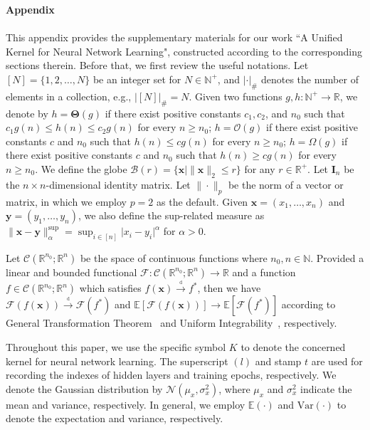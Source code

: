 \documentclass[review,10pt]{JMtemplate}
\begin{document}
{\Large\bfseries Appendix} \\~\\
This appendix provides the supplementary materials for our work ``A Unified Kernel for Neural Network Learning", constructed according to the corresponding sections therein. Before that, we first review the useful notations. Let $[N] = \{1, 2, \dots, N\}$ be an integer set for $N \in \mathbb{N}^+$, and $|\cdot|_{\#}$ denotes the number of elements in a collection, e.g., $|[N]|_{\#} = N$. Given two functions $g,h\colon \mathbb{N}^+\rightarrow \mathbb{R}$, we denote by $h=\mathbf{\Theta}(g)$ if there exist positive constants $c_1,c_2$, and $n_0$ such that $c_1g(n) \leq h(n) \leq c_2g(n)$ for every $n \geq n_0$; $h=\mathcal{O}(g)$ if there exist positive constants $c$ and $n_0$ such that $h(n) \leq cg(n)$ for every $n \geq n_0$; $h=\Omega(g)$ if there exist positive constants $c$ and $n_0$ such that $h(n) \geq cg(n)$ for every $n \geq n_0$. We define the globe $\mathcal{B}(r) = \{ \boldsymbol{x} \mid \| \boldsymbol{x} \|_2 \leq r \}$ for any $r\in\mathbb{R}^+$. Let $\mathbf{I}_n$ be the $n \times n$-dimensional identity matrix. Let $\|\cdot\|_p$ be the norm of a vector or matrix, in which we employ $p=2$ as the default. Given $\boldsymbol{x}=(x_1,\dots,x_n)$ and $\boldsymbol{y}=(y_1,\dots,y_n)$, we also define the sup-related measure as $\| \boldsymbol{x} - \boldsymbol{y} \|_{\alpha}^{\textrm{sup}} = \sup_{i\in[n]} \big| x_i - y_i \big|^{\alpha}$ for $\alpha>0$.

Let $\mathcal{C}(\mathbb{R}^{n_0};\mathbb{R}^n)$ be the space of continuous functions where $n_0,n\in\mathbb{N}$. Provided a linear and bounded functional $\mathcal{F}: \mathcal{C}(\mathbb{R}^{n_0};\mathbb{R}^n) \to \mathbb{R}$ and a function $f \in  \mathcal{C}(\mathbb{R}^{n_0};\mathbb{R}^n)$ which satisfies $f(\boldsymbol{x}) \overset{\underset{\mathrm{d}}{}}{\to} f^*$, then we have $\mathcal{F} (f(\boldsymbol{x})) \overset{\underset{\mathrm{d}}{}}{\to} \mathcal{F}(f^*)$ and $\mathbb{E} \left[ \mathcal{F} (f(\boldsymbol{x})) \right] \to \mathbb{E} \left[ \mathcal{F}(f^*) \right]$ according to General Transformation Theorem~\citep[Theorem 2.3]{van2000asymptotic} and Uniform Integrability~\citep{billingsley2013convergence}, respectively.

Throughout this paper, we use the specific symbol $K$ to denote the concerned kernel for neural network learning. The superscript $(l)$ and stamp $t$ are used for recording the indexes of hidden layers and training epochs, respectively. We denote the Gaussian distribution by $\mathcal{N}(\mu_x, \sigma_x^2)$, where $\mu_x$ and $\sigma_x^2$ indicate the mean and variance, respectively. In general, we employ $\mathbb{E}(\cdot)$ and $\mathrm{Var}(\cdot)$ to denote the expectation and variance, respectively.
\end{document}
